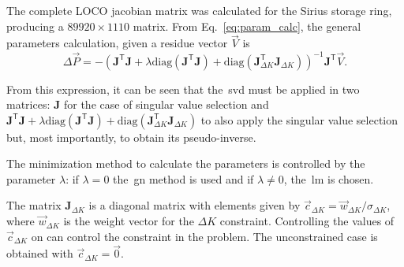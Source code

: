 The complete LOCO jacobian matrix was calculated for the Sirius storage ring, producing a $89920 \times 1110$ matrix. From Eq.~\eqref{eq:param_calc}, the general parameters calculation, given a residue vector $\vec{V}$ is
\begin{equation*}
\Delta \vec{P} = - \left(\mathbf{J}^{\mathsf{T}}\mathbf{J} + \lambda \mathrm{diag}\left(\mathbf{J}^{\mathsf{T}}\mathbf{J}\right) + \mathrm{diag}\left(\mathbf{J}^{\mathsf{T}}_{\Delta K}\mathbf{J}_{\Delta K}\right) \right)^{-1}\mathbf{J}^{\mathsf{T}}\vec{V}.
\end{equation*}

From this expression, it can be seen that the~\gls{svd} must be applied in two matrices: $\mathbf{J}$ for the case of singular value selection and $\mathbf{J}^{\mathsf{T}}\mathbf{J} + \lambda \mathrm{diag}\left(\mathbf{J}^{\mathsf{T}}\mathbf{J}\right) + \mathrm{diag}\left(\mathbf{J}^{\mathsf{T}}_{\Delta K}\mathbf{J}_{\Delta K}\right)$ to also apply the singular value selection but, most importantly, to obtain its pseudo-inverse.

The minimization method to calculate the parameters is controlled by the parameter $\lambda$: if $\lambda = 0$ the~\gls{gn} method is used and if $\lambda \neq 0$, the~\gls{lm} is chosen.

The matrix $\mathbf{J}_{\Delta K}$ is a diagonal matrix with elements given by $\vec{c}_{\Delta K} = \vec{w}_{\Delta K}/\sigma_{\Delta K}$, where $\vec{w}_{\Delta K}$ is the weight vector for the ${\Delta K}$ constraint. Controlling the values of $\vec{c}_{\Delta K}$ on can control the constraint in the problem. The unconstrained case is obtained with $\vec{c}_{\Delta K} = \vec{0}$.

